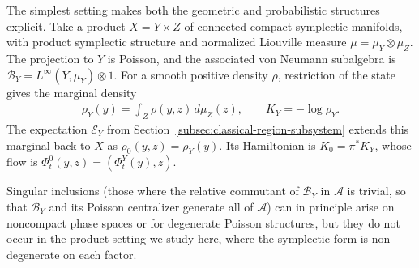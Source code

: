 \documentclass[a4paper,11pt]{article}
\theoremstyle{definition}
\theoremstyle{remark}
\newcommand{\mA}{\mathcal{A}}
\newcommand{\mB}{\mathcal{B}}
\newcommand{\mE}{\mathcal{E}}
\begin{document}
The simplest setting makes both the geometric and probabilistic structures explicit.
Take a product $X=Y\times Z$ of connected compact symplectic manifolds, with product
symplectic structure and normalized Liouville measure $\mu=\mu_Y\otimes\mu_Z$.  The
projection to $Y$ is Poisson, and the associated von Neumann subalgebra is
$\mB_Y=L^\infty(Y,\mu_Y)\otimes1$.  For a smooth positive density $\rho$, restriction
of the state gives the marginal density
\begin{align}\label{eq:classical-marginal-Hamiltonian}
    \rho_Y(y)=\int_Z\rho(y,z)\,d\mu_Z(z),\qquad K_Y=-\log\rho_Y.
\end{align}
The expectation $\mE_Y$ from Section~\ref{subsec:classical-region-subsystem} extends
this marginal back to $X$ as $\rho_0(y,z)=\rho_Y(y)$.  Its Hamiltonian is
$K_0=\pi^*K_Y$, whose flow is $\Phi_t^0(y,z)=(\Phi_t^Y(y),z)$.
 
Singular inclusions (those where the relative commutant of $\mB_Y$ in $\mA$ is
trivial, so that $\mB_Y$ and its Poisson centralizer generate all of $\mA$) can in
principle arise on noncompact phase spaces or for degenerate Poisson structures, but
they do not occur in the product setting we study here, where the symplectic form is
non-degenerate on each factor.
 
\end{document}
